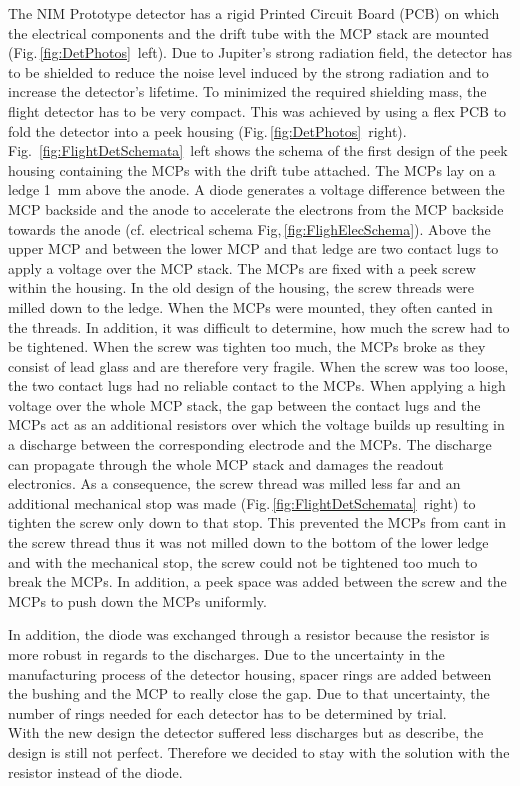 		The NIM Prototype detector has a rigid Printed Circuit Board (PCB) on which the electrical components and the drift tube with the MCP stack are mounted (Fig.\,\ref{fig:DetPhotos}~left). Due to Jupiter's strong radiation field, the detector has to be shielded to reduce the noise level induced by the strong radiation and to increase the detector's lifetime. To minimized the required shielding mass, the flight detector has to be very compact. This was achieved by using a flex PCB to fold the detector into a peek housing (Fig.\,\ref{fig:DetPhotos}~right). Fig.~\ref{fig:FlightDetSchemata}~left shows the schema of the first design of the peek housing containing the MCPs with the drift tube attached. The MCPs lay on a ledge 1~mm above the anode. A diode generates a voltage difference between the MCP backside and the anode to accelerate the electrons from the MCP backside towards the anode (cf. electrical schema Fig,\,\ref{fig:FlighElecSchema}). Above the upper MCP and between the lower MCP and that ledge are two contact lugs to apply a voltage over the MCP stack. The MCPs are fixed with a peek screw within the housing. In the old design of the housing, the screw threads were milled down to the ledge. When the MCPs were mounted, they often canted in the threads. In addition, it was difficult to determine, how much the screw had to be tightened. When the screw was tighten too much, the MCPs broke as they consist of lead glass and are therefore very fragile. When the screw was too loose, the two contact lugs had no reliable contact to the MCPs. When applying a high voltage over the whole MCP stack, the gap between the contact lugs and the MCPs act as an additional resistors over which the voltage builds up resulting in a discharge between the corresponding electrode and the MCPs. The discharge can propagate through the whole MCP stack and damages the readout electronics. As a consequence, the screw thread was milled less far and an additional mechanical stop was made (Fig.\,\ref{fig:FlightDetSchemata}~right) to tighten the screw only down to that stop. This prevented the MCPs from cant in the screw thread thus it was not milled down to the bottom of the lower ledge and with the mechanical stop, the screw could not be tightened too much to break the MCPs. In addition, a peek space was added between the screw and the MCPs to push down the MCPs uniformly.
		
		In addition, the diode was exchanged through a resistor because the resistor is more robust in regards to the discharges. Due to the uncertainty in the manufacturing process of the detector housing, spacer rings are added between the bushing and the MCP to really close the gap. Due to that uncertainty, the number of rings needed for each detector has to be determined by trial.\\
		With the new design the detector suffered less discharges but as describe, the design is still not perfect. Therefore we decided to stay with the solution with the resistor instead of the diode.
		

